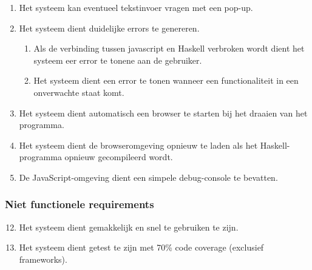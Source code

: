 \begin{enumerate}[{R}1]
	\item Het systeem kan eventueel tekstinvoer vragen met een pop-up.
	\item Het systeem dient duidelijke errors te genereren.
	\begin{enumerate}[{R8.}1]
		\item Als de verbinding tussen javascript en Haskell verbroken wordt dient het systeem eer error te tonene aan de gebruiker. 
		\item Het systeem dient een error te tonen wanneer een functionaliteit in een onverwachte staat komt.
	\end{enumerate}
	\item Het systeem dient automatisch een browser te starten bij het draaien van het programma.
	\item Het systeem dient de browseromgeving opnieuw te laden als het Haskell-programma opnieuw gecompileerd wordt.
	\item De JavaScript-omgeving dient een simpele debug-console te bevatten.

\end{enumerate}

\subsubsection{Niet functionele requirements}
\begin{enumerate}[{R}1]
\setcounter{enumi}{11}
	\item Het systeem dient gemakkelijk en snel te gebruiken te zijn.
	\item Het systeem dient getest te zijn met 70\% code coverage (exclusief frameworks).
\end{enumerate}